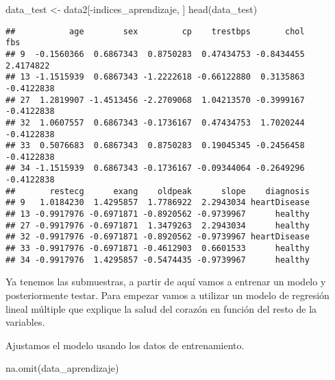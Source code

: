 \documentclass[
]{article}
\newenvironment{Shaded}{\begin{snugshade}}{\end{snugshade}}
\newcommand{\FunctionTok}[1]{\textcolor[rgb]{0.00,0.00,0.00}{#1}}
\newcommand{\NormalTok}[1]{#1}
\newcommand{\OtherTok}[1]{\textcolor[rgb]{0.56,0.35,0.01}{#1}}
\newcommand{\SpecialCharTok}[1]{\textcolor[rgb]{0.00,0.00,0.00}{#1}}
\begin{document}
\begin{Shaded}
\begin{Highlighting}[]
\NormalTok{data\_test }\OtherTok{\textless{}{-}}\NormalTok{ data2[}\SpecialCharTok{{-}}\NormalTok{indices\_aprendizaje, ]}
\FunctionTok{head}\NormalTok{(data\_test)}
\end{Highlighting}
\end{Shaded}

\begin{verbatim}
##           age        sex         cp    trestbps       chol        fbs
## 9  -0.1560366  0.6867343  0.8750283  0.47434753 -0.8434455  2.4174822
## 13 -1.1515939  0.6867343 -1.2222618 -0.66122880  0.3135863 -0.4122838
## 27  1.2819907 -1.4513456 -2.2709068  1.04213570 -0.3999167 -0.4122838
## 32  1.0607557  0.6867343 -0.1736167  0.47434753  1.7020244 -0.4122838
## 33  0.5076683  0.6867343  0.8750283  0.19045345 -0.2456458 -0.4122838
## 34 -1.1515939  0.6867343 -0.1736167 -0.09344064 -0.2649296 -0.4122838
##       restecg      exang    oldpeak      slope    diagnosis
## 9   1.0184230  1.4295857  1.7786922  2.2943034 heartDisease
## 13 -0.9917976 -0.6971871 -0.8920562 -0.9739967      healthy
## 27 -0.9917976 -0.6971871  1.3479263  2.2943034      healthy
## 32 -0.9917976 -0.6971871 -0.8920562 -0.9739967 heartDisease
## 33 -0.9917976 -0.6971871 -0.4612903  0.6601533      healthy
## 34 -0.9917976  1.4295857 -0.5474435 -0.9739967      healthy
\end{verbatim}

Ya tenemos las submuestras, a partir de aquí vamos a entrenar un modelo
y posteriormente testar. Para empezar vamos a utilizar un modelo de
regresión lineal múltiple que explique la salud del corazón en función
del resto de la variables.

Ajustamos el modelo usando los datos de entrenamiento.

\begin{Shaded}
\begin{Highlighting}[]
\FunctionTok{na.omit}\NormalTok{(data\_aprendizaje)}
\end{Highlighting}
\end{Shaded}
\end{document}
